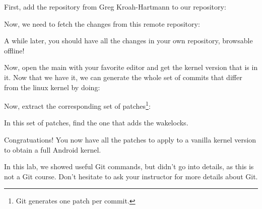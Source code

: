 First, add the  repository from Greg Kroah-Hartmann
to our repository:


Now, we need to fetch the changes from this remote repository:


A while later, you should have all the changes in your own repository,
browsable offline!

Now, open the main  with your favorite editor and get
the kernel version that is in it. Now that we have it, we can generate
the whole set of commits that differ from the linux kernel by doing:


Now, extract the corresponding set of patches\footnote{Git generates
  one patch per commit.}:


In this set of patches, find the one that adds the wakelocks.

Congratuations! You now have all the patches to apply to a vanilla
kernel version to obtain a full Android kernel.

In this lab, we showed useful Git commands, but didn't go into
details, as this is not a Git course. Don't hesitate to ask your
instructor for more details about Git.
